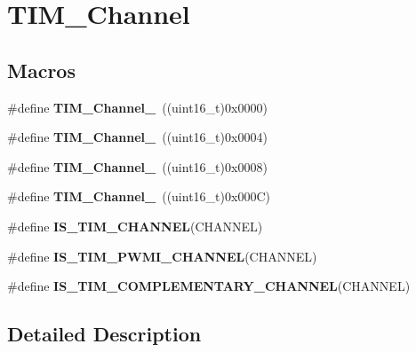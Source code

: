 \hypertarget{group___t_i_m___channel}{\section{T\-I\-M\-\_\-\-Channel}
\label{group___t_i_m___channel}
}
\subsection*{Macros}
\begin{DoxyCompactItemize}
\item 
\hypertarget{group___t_i_m___channel_ga69ea7f558f02c63dd1082d784d2449bd}{\#define {\bfseries T\-I\-M\-\_\-\-Channel\-\_}~((uint16\-\_\-t)0x0000)}\label{group___t_i_m___channel_ga69ea7f558f02c63dd1082d784d2449bd}

\item 
\hypertarget{group___t_i_m___channel_ga03d7da8269a87a560f68985b4bd80931}{\#define {\bfseries T\-I\-M\-\_\-\-Channel\-\_}~((uint16\-\_\-t)0x0004)}\label{group___t_i_m___channel_ga03d7da8269a87a560f68985b4bd80931}

\item 
\hypertarget{group___t_i_m___channel_ga012711b19e8c91f6f352801a3dc0bcc9}{\#define {\bfseries T\-I\-M\-\_\-\-Channel\-\_}~((uint16\-\_\-t)0x0008)}\label{group___t_i_m___channel_ga012711b19e8c91f6f352801a3dc0bcc9}

\item 
\hypertarget{group___t_i_m___channel_ga7414888c40d066af235bc1f80b99bd9d}{\#define {\bfseries T\-I\-M\-\_\-\-Channel\-\_}~((uint16\-\_\-t)0x000\-C)}\label{group___t_i_m___channel_ga7414888c40d066af235bc1f80b99bd9d}

\item 
\#define {\bfseries I\-S\-\_\-\-T\-I\-M\-\_\-\-C\-H\-A\-N\-N\-E\-L}(C\-H\-A\-N\-N\-E\-L)
\item 
\#define {\bfseries I\-S\-\_\-\-T\-I\-M\-\_\-\-P\-W\-M\-I\-\_\-\-C\-H\-A\-N\-N\-E\-L}(C\-H\-A\-N\-N\-E\-L)
\item 
\#define {\bfseries I\-S\-\_\-\-T\-I\-M\-\_\-\-C\-O\-M\-P\-L\-E\-M\-E\-N\-T\-A\-R\-Y\-\_\-\-C\-H\-A\-N\-N\-E\-L}(C\-H\-A\-N\-N\-E\-L)
\end{DoxyCompactItemize}


\subsection{Detailed Description}


